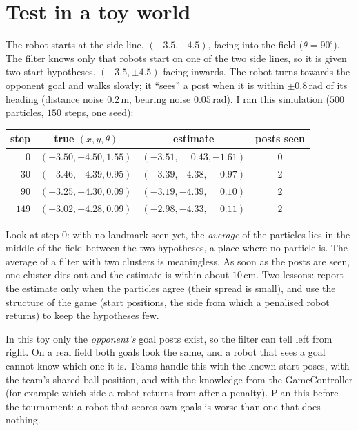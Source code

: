 \section*{Test in a toy world}
The robot starts at the side line, $(-3.5,-4.5)$, facing into the field ($\theta=90^\circ$). The filter knows only that robots start on one of the two side lines, so it is given two start hypotheses, $(-3.5,\pm4.5)$ facing inwards. The robot turns towards the opponent goal and walks slowly; it ``sees'' a post when it is within $\pm0.8$\,rad of its heading (distance noise $0.2$\,m, bearing noise $0.05$\,rad). I ran this simulation ($500$ particles, $150$ steps, one seed):
\begin{center}
\small
\begin{tabular}{rccc}
\hline
step & true $(x,y,\theta)$ & estimate & posts seen\\
\hline
$0$ & $(-3.50,-4.50,1.55)$ & $(-3.51,\phantom{-}0.43,-1.61)$ & $0$\\
$30$ & $(-3.46,-4.39,0.95)$ & $(-3.39,-4.38,\phantom{-}0.97)$ & $2$\\
$90$ & $(-3.25,-4.30,0.09)$ & $(-3.19,-4.39,\phantom{-}0.10)$ & $2$\\
$149$ & $(-3.02,-4.28,0.09)$ & $(-2.98,-4.33,\phantom{-}0.11)$ & $2$\\
\hline
\end{tabular}
\end{center}
Look at step $0$: with no landmark seen yet, the \emph{average} of the particles lies in the middle of the field between the two hypotheses, a place where no particle is. The average of a filter with two clusters is meaningless. As soon as the posts are seen, one cluster dies out and the estimate is within about $10$\,cm. Two lessons: report the estimate only when the particles agree (their spread is small), and use the structure of the game (start positions, the side from which a penalised robot returns) to keep the hypotheses few.

\begin{guessbox}
In this toy only the \emph{opponent's} goal posts exist, so the filter can tell left from right. On a real field both goals look the same, and a robot that sees a goal cannot know which one it is. Teams handle this with the known start poses, with the team's shared ball position, and with the knowledge from the GameController (for example which side a robot returns from after a penalty)\guess. Plan this before the tournament: a robot that scores own goals is worse than one that does nothing.
\end{guessbox}

